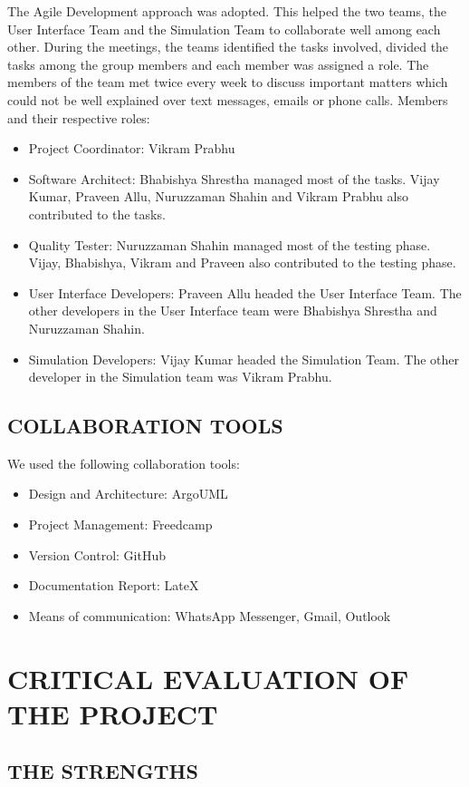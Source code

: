 \documentclass[11pt,a4paper]{article}
\begin{document}
The Agile Development approach was adopted. This helped the two teams, the User Interface Team and the Simulation Team to collaborate well among each other. During the meetings, the teams identified the tasks involved, divided the tasks among the group members and each member was assigned a role. The members of the team met twice every week to discuss important matters which could not be well explained over text messages, emails or phone calls.\newline
Members and their respective roles:
\begin{itemize}
\item Project Coordinator: Vikram Prabhu
\item Software Architect: Bhabishya Shrestha managed most of the tasks. Vijay Kumar, Praveen Allu, Nuruzzaman Shahin and Vikram Prabhu also contributed to the tasks.
\item Quality Tester: Nuruzzaman Shahin managed most of the testing phase. Vijay, Bhabishya, Vikram and Praveen also contributed to the testing phase.
\item User Interface Developers: Praveen Allu headed the User Interface Team. The other developers in the User Interface team were Bhabishya Shrestha and Nuruzzaman Shahin.
\item Simulation Developers: Vijay Kumar headed the Simulation Team. The other developer in the Simulation team was Vikram Prabhu.
\end{itemize}

\subsection{COLLABORATION TOOLS}
We used the following collaboration tools:
\begin{itemize}
\item Design and Architecture: ArgoUML
\item Project Management: Freedcamp 
\item Version Control: GitHub
\item Documentation Report: LateX
\item Means of communication: WhatsApp Messenger, Gmail, Outlook
\end{itemize}


\section{CRITICAL EVALUATION OF THE PROJECT}

\subsection{THE STRENGTHS}
\end{document}
